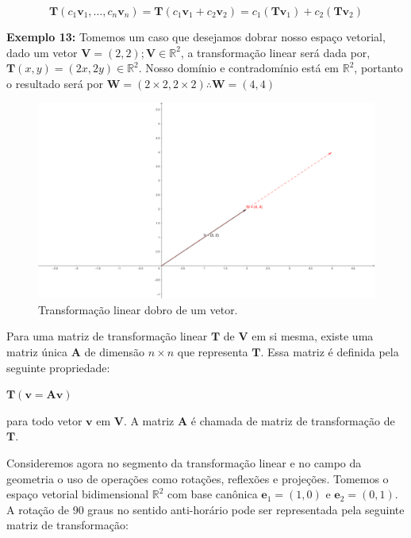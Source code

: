 \begin{equation}
\mathbf{T}(c_1\mathbf{v}_1, \ldots, c_n\mathbf{v}_n) = \mathbf{T}(c_1\mathbf{v}_1 + c_2\mathbf{v}_2) = c_1(\mathbf{T}\mathbf{v}_1) + c_2(\mathbf{T}\mathbf{v}_2)
\end{equation}

\noindent\textbf{Exemplo 13:} Tomemos um caso que desejamos dobrar nosso espaço vetorial, dado um vetor $\mathbf{V} = (2, 2); \mathbf{V} \in \mathbb{R}^2$, a transformação linear será dada por, $\mathbf{T}(x, y) = (2x, 2y) \in \mathbb{R}^2$. Nosso domínio e contradomínio está em $\mathbb{R}^2$, portanto o resultado será por $\mathbf{W} = (2 \times 2, 2 \times 2) \therefore \mathbf{W} = (4, 4)$

\begin{figure}[H]
	\centering
	\includegraphics[scale=1.30]{t_exemplo13.png}
	\caption{Transformação linear dobro de um vetor.}
\end{figure}

Para uma matriz de transformação linear $\mathbf{T}$ de $\mathbf{V}$ em si mesma, existe uma matriz única $\mathbf{A}$ de dimensão $ n \times n$ que representa $\mathbf{T}$. Essa matriz é definida pela seguinte propriedade:

\centerline{$\mathbf{T}(\mathbf{v} = \mathbf{A}\mathbf{v})$}

\noindent para todo vetor $\mathbf{v}$ em $\mathbf{V}$. A matriz $\mathbf{A}$ é chamada de matriz de transformação de $\mathbf{T}$.

Consideremos agora no segmento da transformação linear e no campo da geometria o uso de operações como rotações, reflexões e projeções. Tomemos o espaço vetorial bidimensional $\mathbb{R}^2$ com base canônica $\mathbf{e}_1 = (1, 0)$ e $\mathbf{e}_2 = (0, 1)$. A rotação de 90 graus no sentido anti-horário pode ser representada pela seguinte matriz de transformação:


